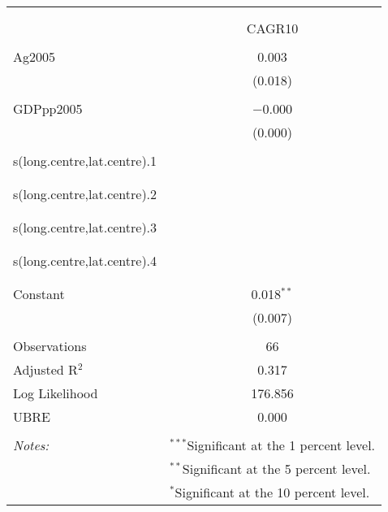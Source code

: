 
\begin{table}[!htbp] \centering 
  \caption{} 
  \label{} 
\begin{tabular}{@{\extracolsep{5pt}}lc} 
\\[-1.8ex]\hline 
\hline \\[-1.8ex] 
\\[-1.8ex] & CAGR10 \\ 
\hline \\[-1.8ex] 
 Ag2005 & 0.003 \\ 
  & (0.018) \\ 
  & \\ 
 GDPpp2005 & $-$0.000 \\ 
  & (0.000) \\ 
  & \\ 
 s(long.centre,lat.centre).1 &  \\ 
  &  \\ 
  & \\ 
 s(long.centre,lat.centre).2 &  \\ 
  &  \\ 
  & \\ 
 s(long.centre,lat.centre).3 &  \\ 
  &  \\ 
  & \\ 
 s(long.centre,lat.centre).4 &  \\ 
  &  \\ 
  & \\ 
 Constant & 0.018$^{**}$ \\ 
  & (0.007) \\ 
  & \\ 
Observations & 66 \\ 
Adjusted R$^{2}$ & 0.317 \\ 
Log Likelihood & 176.856 \\ 
UBRE & 0.000 \\ 
\hline \\[-1.8ex] 
\textit{Notes:} & \multicolumn{1}{l}{$^{***}$Significant at the 1 percent level.} \\ 
 & \multicolumn{1}{l}{$^{**}$Significant at the 5 percent level.} \\ 
 & \multicolumn{1}{l}{$^{*}$Significant at the 10 percent level.} \\ 
\end{tabular} 
\end{table} 
